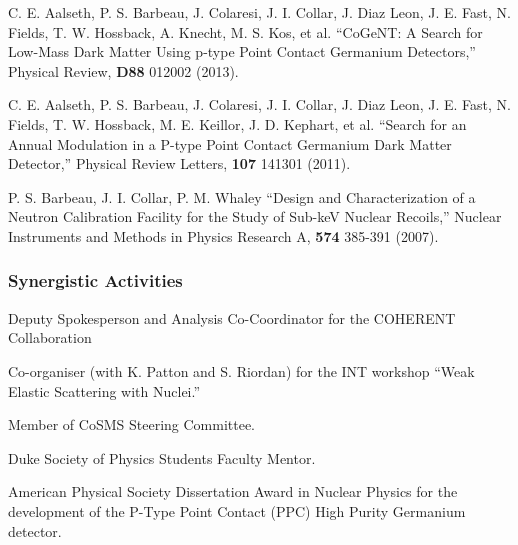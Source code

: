 \documentclass[12pt]{article}
\begin{document}
\begin{list}{}{
        \setlength{\itemindent}{-0.2in}
        \setlength{\itemsep}{0.0in}
        \setlength{\leftmargin}{0.2in}
        \setlength{\parsep}{0.0in}
        }
\item C. E. Aalseth, P. S. Barbeau, J. Colaresi, J. I. Collar, J. Diaz Leon, J. E. Fast, N. Fields, T. W. Hossback, A. Knecht, M. S. Kos, et al. ``CoGeNT: A Search for Low-Mass Dark Matter Using p-type Point Contact Germanium Detectors,'' Physical Review, \textbf{D88} 012002 (2013).
\\

\item C. E. Aalseth, P. S. Barbeau, J. Colaresi, J. I. Collar, J. Diaz Leon, J. E. Fast, N. Fields, T. W. Hossback, M. E. Keillor, J. D. Kephart, et al. ``Search for an Annual Modulation in a P-type Point Contact Germanium Dark Matter Detector,'' Physical Review Letters, \textbf{107} 141301 (2011). 
\\


\item P. S. Barbeau, J. I. Collar, P. M. Whaley ``Design and Characterization of a Neutron Calibration Facility for the Study of Sub-keV Nuclear Recoils,'' Nuclear Instruments and Methods in Physics Research A, \textbf{574} 385-391 (2007). 





\end{list}




\subsubsection*{Synergistic Activities}

\begin{list}{--}{\itemindent=-0.1in \itemsep=1pt \parsep=0pt}
\item Deputy Spokesperson and Analysis Co-Coordinator for the COHERENT Collaboration
\item Co-organiser (with K. Patton and S. Riordan) for the INT workshop ``Weak Elastic Scattering with Nuclei.''
\item Member of CoSMS Steering Committee. 
\item Duke Society of Physics Students Faculty Mentor.
\item American Physical Society Dissertation Award in Nuclear Physics for the development of the P-Type Point Contact (PPC) High Purity Germanium detector.


\end{list}
\end{document}
